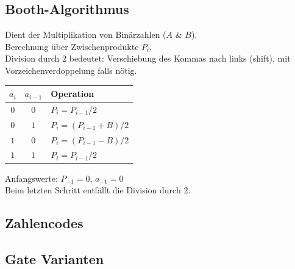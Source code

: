 \subsection{Booth-Algorithmus}
Dient der Multiplikation von Binärzahlen ($A$ \& $B$).\\
Berechnung über Zwischenprodukte $P_i$.\\
Division durch 2 bedeutet: Verschiebung des Kommas nach links (shift), mit Vorzeichenverdoppelung falls nötig.
\begin{center}
    \begin{tabular}{c c l}
        $a_i$ & $a_{i - 1}$ & Operation\\
        \hline
        $0$ & $0$ & $P_i = P_{i-1}/2$\\
        $0$ & $1$ & $P_i = (P_{i-1} + B)/2$\\
        $1$ & $0$ & $P_i = (P_{i-1} - B)/2$\\
        $1$ & $1$ & $P_i = P_{i-1}/2$\\
    \end{tabular}
\end{center}
Anfangswerte: $P_{-1} = 0$, $a_{-1} = 0$\\
Beim letzten Schritt entfällt die Division durch 2.

\subsection{Zahlencodes}
\begin{center}
\end{center}

\subsection{Gate Varianten}
\begin{center}
\end{center}